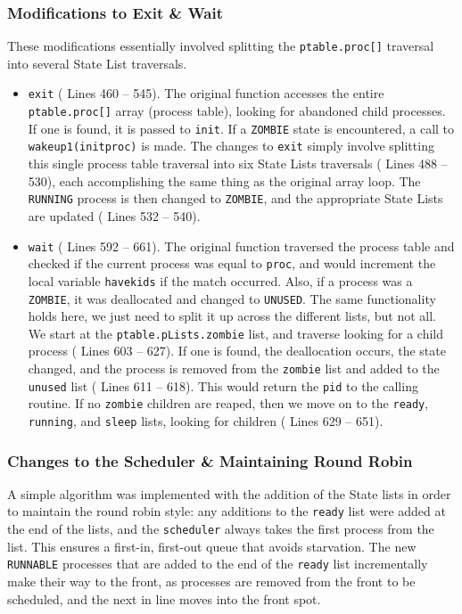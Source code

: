 \documentclass[11pt,letterpaper]{report}
\begin{document}
	 \subsubsection{Modifications to Exit \& Wait}
	 
	 These modifications essentially involved splitting the {\tt ptable.proc[]} traversal into several State List traversals. 
	 
	 \begin{itemize}
	 	\item {\tt exit} ({\color{red} Lines 460 -- 545}). The original function accesses the entire {\tt ptable.proc[]} array (process table), looking for abandoned child processes. If one is found, it is passed to {\tt init}. If a {\tt ZOMBIE} state is encountered, a call to {\tt wakeup1(initproc)} is made. The changes to {\tt exit} simply involve splitting this single process table traversal into six State Lists traversals ({\color{red} Lines 488 -- 530}), each accomplishing the same thing as the original array loop. The {\tt RUNNING} process is then changed to {\tt ZOMBIE}, and the appropriate State Lists are updated ({\color{red} Lines 532 -- 540}).
	 	
	 	\item {\tt wait} ({\color{red} Lines 592 -- 661}). The original function traversed the process table and checked if the current process was equal to {\tt proc}, and would increment the local variable {\tt havekids} if the match occurred. Also, if a process was a {\tt ZOMBIE}, it was deallocated and changed to {\tt UNUSED}. The same functionality holds here, we just need to split it up across the different lists, but not all. We start at the {\tt ptable.pLists.zombie} list, and traverse looking for a child process ({\color{red} Lines 603 -- 627}). If one is found, the deallocation occurs, the state changed, and the process is removed from the {\tt zombie} list and added to the {\tt unused} list ({\color{red} Lines 611 -- 618}). This would return the {\tt pid} to the calling routine. If no {\tt zombie} children are reaped, then we move on to the {\tt ready}, {\tt running}, and {\tt sleep} lists, looking for children ({\color{red} Lines 629 -- 651}).
	 \end{itemize}
 
 	\subsubsection{Changes to the Scheduler \& Maintaining Round Robin}
 	
 	A simple algorithm was implemented with the addition of the State lists in order to maintain the round robin style: any additions to the {\tt ready} list were added at the end of the lists, and the {\tt scheduler} always takes the first process from the list. This ensures a first-in, first-out queue that avoids starvation. The new {\tt RUNNABLE} processes that are added to the end of the {\tt ready} list incrementally make their way to the front, as processes are removed from the front to be scheduled, and the next in line moves into the front spot.
 	
\end{document}
